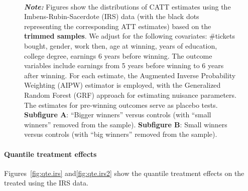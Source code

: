 \documentclass[letterpaper,12pt,leqno]{article}
\begin{document}
\begin{figure}[!ht]
\begin{minipage}[c]{1\textwidth}
    \end{minipage}%
    \\\raggedright
     {\footnotesize\textbf{\textit{Note:}} Figures show the distributions of CATT estimates using the Imbens-Rubin-Sacerdote (IRS) data (with the black dots representing the corresponding ATT estimates) based on the \textbf{trimmed samples}.  We adjust for the following covariates: \#tickets bought, gender, work then, age at winning, years of education, college degree, earnings 6 years before winning. The outcome variables include earnings from 5 years before winning to 6 years after winning. For each estimate, the Augmented Inverse Probability Weighting (AIPW) estimator is employed, with the Generalized Random Forest (GRF) approach for estimating nuisance parameters. The estimates for pre-winning outcomes serve as placebo tests. \textbf{Subfigure A}: ``Bigger winners'' versus controls (with ``small winners'' removed from the sample). \textbf{Subfigure B}: Small winners versus controls (with ``big winners'' removed from the sample).}
\end{figure}

\FloatBarrier
\clearpage

\paragraph{Quantile treatment effects} Figures~\ref{fig:qte.irs} and\ref{fig:qte.irs2} show the quantile treatment effects on the treated using the IRS data. 
\end{document}
